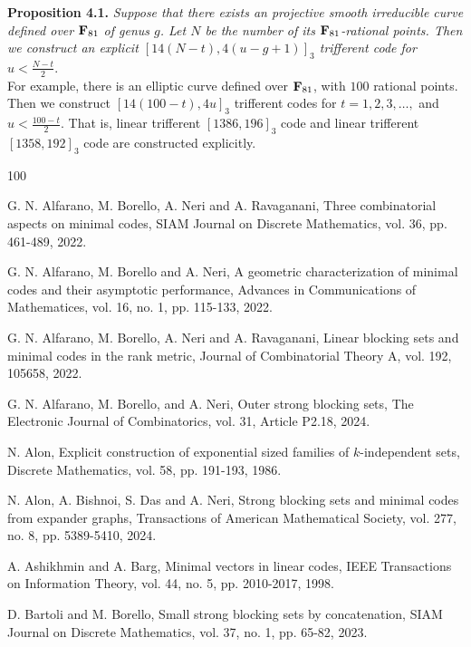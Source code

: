 \documentclass[10pt,a4paper]{article}
\begin{document}
{\bf Proposition 4.1.} {\em Suppose that there exists an projective smooth irreducible curve defined over ${\bf F}_{81}$
of genus $g$. Let $N$ be the number of its ${\bf F}_{81}$-rational points. Then we construct an explicit $[14(N-t),4(u-g+1)]_3$ trifferent code for $u < \frac{N-t}{2}.$}\\

For example, there is an elliptic curve defined over ${\bf F}_{81}$, with $100$ rational points. Then we construct $[14(100-t), 4u]_3$ trifferent codes for $t=1,2,3,\ldots,$ and $u < \frac{100-t}{2}.$ That is, linear trifferent $[1386,196]_3$ code and linear trifferent $[1358,192]_3$ code are constructed explicitly.\\


\begin{thebibliography}{100}

 G. N. Alfarano, M. Borello, A. Neri and A. Ravaganani, Three combinatorial aspects on minimal codes, SIAM Journal on Discrete Mathematics, vol. 36, pp. 461-489, 2022.

 G. N. Alfarano, M. Borello and A. Neri, A geometric characterization
of minimal codes and their asymptotic performance, Advances in Communications of Mathematices, vol. 16, no. 1, pp. 115-133, 2022.

 G. N. Alfarano, M. Borello, A. Neri and A. Ravaganani, Linear blocking sets and minimal codes in the rank metric, Journal of Combinatorial Theory A, vol. 192, 105658, 2022.

  G. N. Alfarano, M. Borello, and A. Neri, Outer strong blocking sets, The Electronic Journal of Combinatorics, vol. 31, Article P2.18, 2024.


 N. Alon, Explicit construction of exponential sized families of $k$-independent sets, Discrete Mathematics, vol. 58, pp. 191-193, 1986.


 N. Alon, A. Bishnoi, S. Das and A. Neri, Strong blocking sets and minimal codes from expander graphs, Transactions of American Mathematical Society, vol. 277, no. 8, pp. 5389-5410, 2024.


 A. Ashikhmin and A. Barg, Minimal vectors in linear codes, IEEE Transactions on Information Theory, vol. 44, no. 5, pp. 2010-2017, 1998.

 D. Bartoli and M. Borello, Small strong blocking sets by concatenation, SIAM Journal on
Discrete Mathematics, vol. 37, no. 1, pp. 65-82, 2023.



\end{thebibliography}
\end{document}
